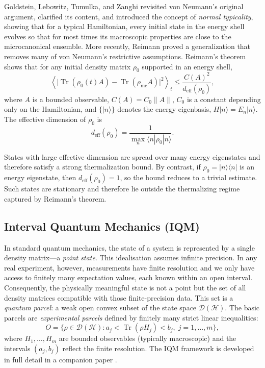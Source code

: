 \documentclass[11pt, onecolumn]{article}
\begin{document}
Goldstein, Lebowitz, Tumulka, and Zanghi \cite{GLTZ2010} revisited von Neumann's original argument, clarified its content, and introduced the concept of \emph{normal typicality}, showing that for a typical Hamiltonian, every initial state in the energy shell evolves so that for most times its macroscopic properties are close to the microcanonical ensemble. More recently, Reimann \cite{Reimann2015} proved a generalization that removes many of von Neumann's restrictive assumptions. Reimann's theorem shows that for any initial density matrix
\(\rho_0\) supported in an energy shell,
\[
\left\langle
\bigl|
\operatorname{Tr}(\rho_0(t)A)
-
\operatorname{Tr}(\rho_{\mathrm{mc}}A)
\bigr|^2
\right\rangle_t
\le
\frac{C(A)^2}{d_{\mathrm{eff}}(\rho_0)},
\]
where \(A\) is a bounded observable,
\(C(A)=C_0\|A\|\),
\(C_0\) is a constant depending only on the Hamiltonian,
and \(\{|n\rangle\}\) denotes the energy eigenbasis,
\(H|n\rangle=E_n|n\rangle\).
The effective dimension of \(\rho_0\) is
\[
d_{\mathrm{eff}}(\rho_0)
=
\frac{1}{\max_n \langle n|\rho_0|n\rangle}.
\]

States with large effective dimension are spread over many energy
eigenstates and therefore satisfy a strong thermalization bound. By
contrast, if \(\rho_0=|n\rangle\langle n|\) is an energy eigenstate,
then \(d_{\mathrm{eff}}(\rho_0)=1\), so the bound reduces to a trivial
estimate. Such states are stationary and therefore lie outside the
thermalizing regime captured by Reimann's theorem.

\subsection{Interval Quantum Mechanics (IQM)}

In standard quantum mechanics, the state of a system is represented by a single density matrix---a \emph{point state}. This idealisation assumes infinite precision. In any real experiment, however, measurements have finite resolution and we only have access to finitely many expectation values, each known within an open interval. Consequently, the physically meaningful state is not a point but the set of all density matrices compatible with those finite-precision data. This set is a \emph{quantum parcel}: a weak open convex subset of the state space \(\mathcal{D}(\mathcal{H})\). The basic parcels are \emph{experimental parcels} defined by finitely many strict linear inequalities:
\[
O = \{\rho\in\mathcal{D}(\mathcal{H}) : a_j < \operatorname{Tr}(\rho H_j) < b_j,\; j=1,\dots,m\},
\]
where \(H_1,\dots,H_m\) are bounded observables (typically macroscopic) and the intervals \((a_j,b_j)\) reflect the finite resolution. The IQM framework is developed in full detail in a companion paper \cite{Edalat2026}.
\end{document}
